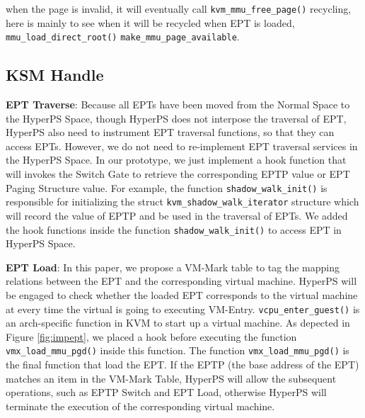 when the page is invalid, it will eventually call \verb|kvm_mmu_free_page()| recycling, here is mainly to see when it will be recycled
when EPT is loaded, \verb|mmu_load_direct_root()| \verb|make_mmu_page_available|.
\fi

\iffalse

\subsection{KSM Handle}%

\textbf{EPT Traverse}: 
Because all EPTs have been moved from the Normal Space to the HyperPS Space, though HyperPS does not interpose the traversal of EPT, HyperPS also need to instrument EPT traversal functions, so that they can access EPTs. 
However, we do not need to re-implement EPT traversal services in the HyperPS Space. In our prototype, we just implement a hook function that will invokes the Switch Gate to retrieve the corresponding EPTP value or EPT Paging Structure value. 
For example, the function \verb|shadow_walk_init()| is responsible for initializing the struct \verb|kvm_shadow_walk_iterator| structure which will record the value of EPTP and be used in the traversal of EPTs. We added the hook functions inside the function \verb|shadow_walk_init()| to access EPT in HyperPS Space. 

\textbf{EPT Load}: 
In this paper, we propose a VM-Mark table to tag the mapping relations between the EPT and the corresponding virtual machine. 
HyperPS will be engaged to check whether the loaded EPT corresponds to the virtual machine at every time the virtual is going to executing VM-Entry. 
\verb|vcpu_enter_guest()| is an arch-specific function in KVM to start up a virtual machine. 
As depected in Figure \ref{fig:impept}, we placed a hook before executing the function \verb|vmx_load_mmu_pgd()| inside this function. The function \verb|vmx_load_mmu_pgd()| is the final function that load the EPT. 
If the EPTP (the base address of the EPT) matches an item in the VM-Mark Table, HyperPS will allow the subsequent operations, such as EPTP Switch and EPT Load, otherwise HyperPS will terminate the execution of the corresponding virtual machine. 

